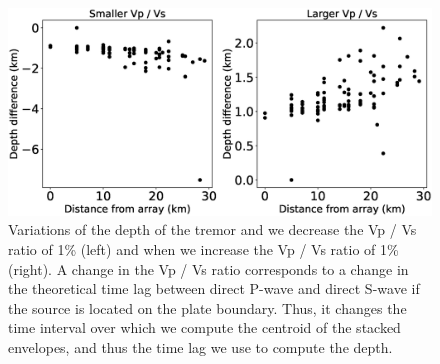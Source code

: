 \documentclass[draft]{agujournal2019}
\begin{document}
\begin{figure}
\noindent\includegraphics[width=\textwidth, trim={0cm 0cm 0cm 0cm},clip]{figures/PWS_PWS.eps}
\caption{Variations of the depth of the tremor and we decrease the Vp / Vs ratio of 1\% (left) and when we increase the Vp / Vs ratio of 1\% (right). A change in the Vp / Vs ratio corresponds to a change in the theoretical time lag between direct P-wave and direct S-wave if the source is located on the plate boundary. Thus, it changes the time interval over which we compute the centroid of the stacked envelopes, and thus the time lag we use to compute the depth.}
\label{pngfiguresample}
\end{figure}
\end{document}
